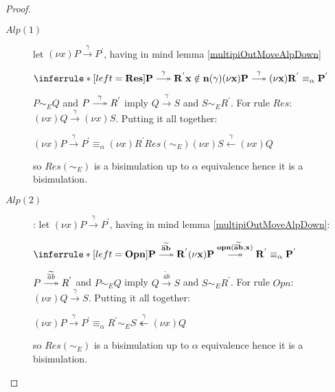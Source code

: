\begin{lemma}
\begin{proof}
\begin{description}
\begin{description}
 	  \item[$Alp(1)$]
	    let $(\nu x)P \xrightarrow{\gamma} P^{'}$, having in mind lemma \ref{multipiOutMoveAlpDown} 
   	    \begin{center}
   	      $\inferrule* [left=\bf{Res}]{
   		  P \stackrel{\gamma}{\longtwoheadrightarrow} R^{'}
 		\\
 		  x \notin n(\gamma)
   	      }{
   		  (\nu x)P \stackrel{\gamma}{\longtwoheadrightarrow} (\nu x)R^{'} \equiv_{\alpha} P^{'}
   	      }$
   	    \end{center}
 	    $P \sim_{E} Q$ and $P \stackrel{\gamma}{\longtwoheadrightarrow} R^{'}$ imply $Q \xrightarrow{\gamma} S$ and $S\sim_{E} R^{'}$. For rule $Res$: $(\nu x)Q \xrightarrow{\gamma} (\nu x)S$. Putting it all together:
 	    \begin{center}
 	      $(\nu x)P \xrightarrow{\gamma} P^{'} \equiv_{\alpha} (\nu x)R^{'} Res(\sim_{E}) (\nu x)S \stackrel{\gamma}{\leftarrow} (\nu x)Q$
 	    \end{center}
 	    so $Res(\sim_{E})$ is a bisimulation up to $\alpha$ equivalence hence it is a bisimulation.
  	  \item[$Alp(2)$]:
 	    let $(\nu x)P \xrightarrow{\gamma} P^{'}$, having in mind lemma \ref{multipiOutMoveAlpDown}:
 	    \begin{center}
 	      $\inferrule* [left=\bf{Opn}]{
 		P \stackrel{\widetilde{\overline{a}b}}{\longtwoheadrightarrow} R^{'}
 	      }{
 		(\nu x)P \stackrel{opn(\widetilde{\overline{a}b}, x)}{\longtwoheadrightarrow} R^{'} \equiv_{\alpha} P^{'}
 	      }$ 
  	    \end{center}
 	    $P \stackrel{\widetilde{\overline{a}b}}{\longtwoheadrightarrow} R^{'}$ and $P \sim_{E} Q$ imply $Q \xrightarrow{\widetilde{\overline{a}b}} S$ and $S\sim_{E} R^{'}$. For rule $Opn$: $(\nu x)Q \xrightarrow{\gamma} S$. Putting it all together:
 	    \begin{center}
 	      $(\nu x)P \xrightarrow{\gamma} P^{'} \equiv_{\alpha} R^{'} \sim_{E} S \stackrel{\gamma}{\twoheadleftarrow} (\nu x)Q$
 	    \end{center}
 	    so $Res(\sim_{E})$ is a bisimulation up to $\alpha$ equivalence hence it is a bisimulation.

\end{description}
\end{description}
\end{proof}
\end{lemma}
